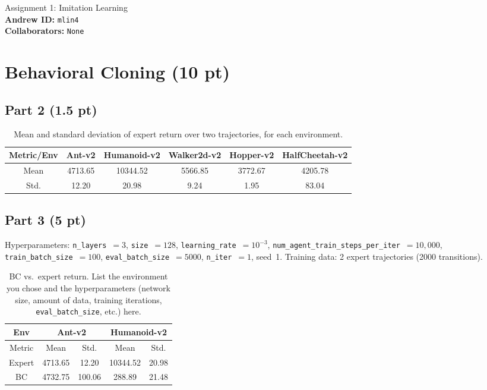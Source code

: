 \documentclass{article}
\begin{document}
\begin{center}
    {\Large Assignment 1: Imitation Learning} \\
    \vspace{.25cm}
    \textbf{Andrew ID:} \texttt{mlin4} \\
    \textbf{Collaborators:} \texttt{None}
\end{center}


\section{Behavioral Cloning (10 pt)}

\subsection{Part 2 (1.5 pt)}
\begin{table}[!h]
  \centering
  \caption{Mean and standard deviation of expert return over two trajectories, for each environment.}
  \begin{tabular}{cccccc}
    \toprule
    Metric/Env & Ant-v2 & Humanoid-v2 & Walker2d-v2 & Hopper-v2 & HalfCheetah-v2 \\
    \midrule
    Mean  & 4713.65	& 10344.52  & 5566.85   & 3772.67 & 4205.78 \\
    Std.  & 12.20   & 20.98     & 9.24	    & 1.95	  & 83.04 \\
    \bottomrule
  \end{tabular}
  \label{tab:p2}
\end{table}

\subsection{Part 3 (5 pt)}
\begin{table}[htbp]
  \centering
  \caption{BC vs.\ expert return. List the environment you chose and the hyperparameters (network size, amount of data, training iterations, \texttt{eval\_batch\_size}, etc.) here.}
  Hyperparameters: \texttt{n\_layers}~$=3$, \texttt{size}~$=128$, \texttt{learning\_rate}~$=10^{-3}$, \texttt{num\_agent\_train\_steps\_per\_iter}~$=10{,}000$, \texttt{train\_batch\_size}~$=100$, \texttt{eval\_batch\_size}~$=5000$, \texttt{n\_iter}~$=1$, seed~1. Training data: 2 expert trajectories (2000 transitions).
  \begin{tabular}{ccccc}
    \toprule
    Env   & \multicolumn{2}{c}{Ant-v2} & \multicolumn{2}{c}{Humanoid-v2} \\
    \midrule
    Metric & Mean  & Std.  & Mean  & Std. \\
    Expert & 4713.65 & 12.20 & 10344.52 & 20.98 \\
    BC    & 4732.75 & 100.06 & 288.89 & 21.48 \\
    \bottomrule
  \end{tabular}
  \label{tab:p3}
\end{table}
\end{document}
